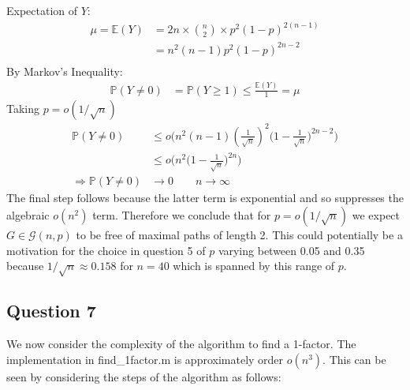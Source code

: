 \documentclass[a4paper]{article}
\begin{document}
Expectation of $Y$:
\begin{align*}
    \mu = \mathbb{E}(Y) &= 2n \times {n\choose2} \times p^2(1-p)^{2(n-1)} \\
                        &= n^2(n-1)p^2(1-p)^{2n-2} \\
\end{align*}
By Markov's Inequality:
\begin{align*}
    \mathbb{P}(Y\neq0) &= \mathbb{P}(Y \geq 1) \leq \frac{\mathbb{E}(Y)}{1} = \mu
\end{align*}
Taking $p=o(1/\sqrt{n})$
\begin{align*}
    \mathbb{P}(Y\neq0) &\leq o\bigg( n^2(n-1)(\frac{1}{\sqrt{n}})^2\big(1-\frac{1}{\sqrt{n}}\big)^{2n-2} \bigg) \\
                       &\leq o\bigg( n^2\big(1-\frac{1}{\sqrt{n}}\big)^{2n} \bigg) \\
    \Rightarrow \mathbb{P}(Y\neq0) &\rightarrow 0 \qquad n\rightarrow\infty
\end{align*}
The final step follows because the latter term is exponential and so suppresses the algebraic $o(n^2)$ term. Therefore we conclude that for $p=o(1/\sqrt{n})$ we expect $G\in \mathcal{G}(n,p)$ to be free of maximal paths of length 2. This could potentially be a motivation for the choice in question 5 of $p$ varying between 0.05 and 0.35 because $1/\sqrt{n} \approx 0.158$ for $n=40$ which is spanned by this range of $p$.


\subsection*{Question 7}

We now consider the complexity of the algorithm to find a 1-factor. The implementation in find\_1factor.m is approximately order $o(n^3)$. This can be seen by considering the steps of the algorithm as follows:
\end{document}
